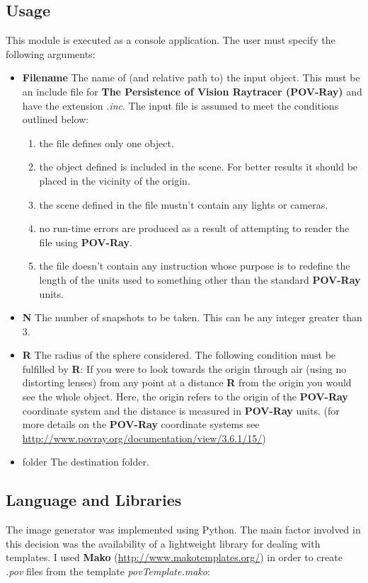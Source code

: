 \documentclass[12pt,a4paper,twoside,openright]{report}
\begin{document}
\subsection{Usage}
This module is executed as a console application. The user must specify the following arguments:
\begin{itemize}
\item \textbf{Filename} The name of (and relative path to) the input object. This must be an include file for \textbf{The Persistence of Vision Raytracer (POV-Ray)} and have the extension \textit{.inc}. The input file is assumed to meet the conditions outlined below:
	\begin{enumerate}
		\item the file defines only one object.
		\item the object defined is included in the scene. For better results it should be placed in the vicinity of the origin.
		\item the scene defined in the file mustn't contain any lights or cameras.
		\item no run-time errors are produced as a result of attempting to render the file using \textbf{POV-Ray}. 
		\item the file doesn't contain any instruction whose purpose is to redefine the length of the units used to something other than the standard \textbf{POV-Ray} units. 
	\end{enumerate}    
\item \textbf{N} The number of snapshots to be taken. This can be any integer greater than 3.
\item \textbf{R} The radius of the sphere considered. The following condition must be fulfilled by \textbf{R}: If you were to look towards the origin through air (using no distorting lenses) from any point at a distance \textbf{R} from the origin you would see the whole object. Here, the origin refers to the origin of the \textbf{POV-Ray} coordinate system and the distance is measured in \textbf{POV-Ray} units.  (for more details on the \textbf{POV-Ray} coordinate systems see \url{http://www.povray.org/documentation/view/3.6.1/15/})
\item {folder} The destination folder.
\end{itemize}

\subsection{Language and Libraries}
The image generator was implemented using Python. The main factor involved in this decision was the availability of a lightweight library for dealing with templates. I used \textbf{Mako} (\url{http://www.makotemplates.org/}) in order to create \textit{.pov} files from the template \textit{povTemplate.mako}: 
\end{document}
